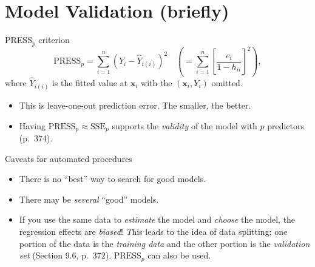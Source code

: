 \documentclass{beamer}
\begin{document}
\section{Model Validation (briefly)}

\begin{frame}{PRESS$_p$ criterion}
$$
\text{PRESS}_p = \sum_{i=1}^n(Y_i-\hat{Y}_{i(i)})^2\quad \left(=\sum_{i=1}^n\left[\frac{e_i}{1-h_{ii}}\right]^2\right),
$$
where $\hat{Y}_{i(i)}$ is the fitted value at $\mathbf{x}_i$ with the $(\mathbf{x}_i, Y_i)$ omitted.
\begin{itemize}
\item\pause This is leave-one-out prediction error. The smaller, the better.
\item\pause Having $\text{PRESS}_p \approx \text{SSE}_p$ supports the \textit{validity} of the model
with $p$ predictors (p.~374). 
\end{itemize}
\end{frame}

\begin{frame}{Caveats for automated procedures}
\begin{itemize}
\item There is no ``best'' way to search for good models.
\item\pause There may be \textit{several} ``good'' models.
\item\pause If you use the same data to \textit{estimate} the model and \textit{choose}
the model, the regression effects are \textit{biased}!
\textit This leads to the idea of data splitting; one portion of the data
is the \textit{training data} and the other portion is the \textit{validation set}
(Section 9.6, p.~372). $\text{PRESS}_p$ can also be used.
\end{itemize}
\end{frame}
\end{document}
